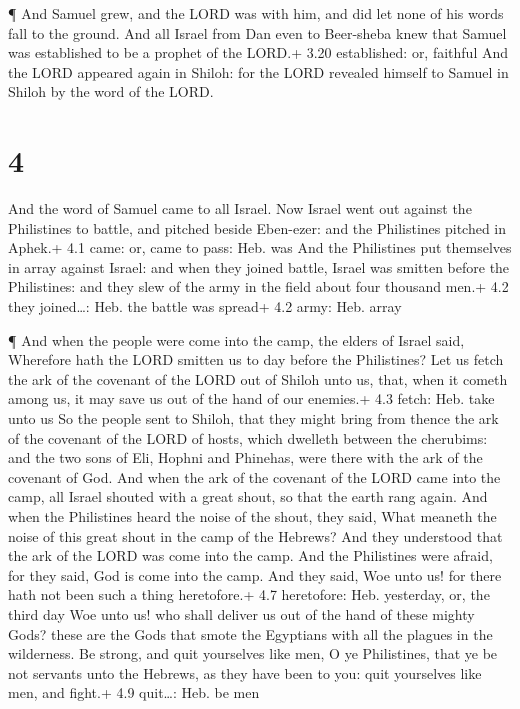  ¶ And Samuel grew, and the LORD was with him, and did let
none of his words fall to the ground.  And all Israel from
Dan even to Beer-sheba knew that Samuel was established to be a prophet
of the LORD.+ 3.20 established: or, faithful  And the LORD
appeared again in Shiloh: for the LORD revealed himself to Samuel in
Shiloh by the word of the LORD.

\hypertarget{section-3}{%
\section{4}\label{section-3}}

 And the word of Samuel came to all Israel. Now Israel went
out against the Philistines to battle, and pitched beside Eben-ezer: and
the Philistines pitched in Aphek.+ 4.1 came: or, came to pass: Heb. was
 And the Philistines put themselves in array against Israel:
and when they joined battle, Israel was smitten before the Philistines:
and they slew of the army in the field about four thousand men.+ 4.2
they joined\ldots: Heb. the battle was spread+ 4.2 army: Heb. array

 ¶ And when the people were come into the camp, the elders
of Israel said, Wherefore hath the LORD smitten us to day before the
Philistines? Let us fetch the ark of the covenant of the LORD out of
Shiloh unto us, that, when it cometh among us, it may save us out of the
hand of our enemies.+ 4.3 fetch: Heb. take unto us  So the
people sent to Shiloh, that they might bring from thence the ark of the
covenant of the LORD of hosts, which dwelleth between the cherubims: and
the two sons of Eli, Hophni and Phinehas, were there with the ark of the
covenant of God.  And when the ark of the covenant of the
LORD came into the camp, all Israel shouted with a great shout, so that
the earth rang again.  And when the Philistines heard the
noise of the shout, they said, What meaneth the noise of this great
shout in the camp of the Hebrews? And they understood that the ark of
the LORD was come into the camp.  And the Philistines were
afraid, for they said, God is come into the camp. And they said, Woe
unto us! for there hath not been such a thing heretofore.+ 4.7
heretofore: Heb. yesterday, or, the third day  Woe unto us!
who shall deliver us out of the hand of these mighty Gods? these are the
Gods that smote the Egyptians with all the plagues in the wilderness.
 Be strong, and quit yourselves like men, O ye Philistines,
that ye be not servants unto the Hebrews, as they have been to you: quit
yourselves like men, and fight.+ 4.9 quit\ldots: Heb. be men

